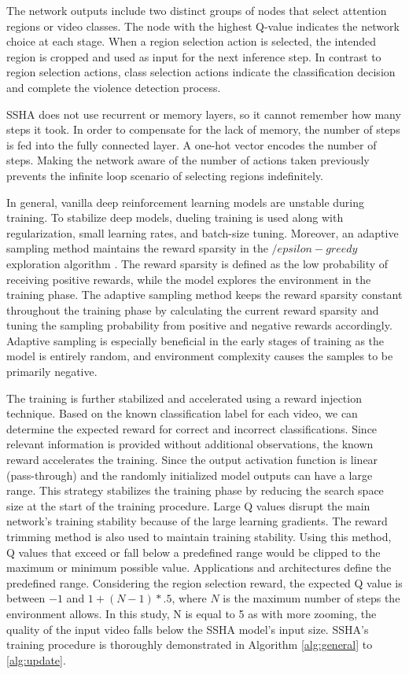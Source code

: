 \documentclass[review]{elsarticle}
\begin{document}
The network outputs include two distinct groups of nodes that select attention regions or video classes. The node with the highest Q-value indicates the network choice at each stage. When a region selection action is selected, the intended region is cropped and used as input for the next inference step. In contrast to region selection actions, class selection actions indicate the classification decision and complete the violence detection process.

SSHA does not use recurrent or memory layers, so it cannot remember how many steps it took. In order to compensate for the lack of memory, the number of steps is fed into the fully connected layer. A one-hot vector encodes the number of steps. Making the network aware of the number of actions taken previously prevents the infinite loop scenario of selecting regions indefinitely.

In general, vanilla deep reinforcement learning models are unstable during training. To stabilize deep models, dueling training {\citep{wang2016dueling}} is used along with regularization, small learning rates, and batch-size tuning. Moreover, an adaptive sampling method maintains the reward sparsity in the $/epsilon - greedy$ exploration algorithm \citep{sutton2018reinforcement}. The reward sparsity is defined as the low probability of receiving positive rewards, while the model explores the environment in the training phase. The adaptive sampling method keeps the reward sparsity constant throughout the training phase by calculating the current reward sparsity and tuning the sampling probability from positive and negative rewards accordingly. Adaptive sampling is especially beneficial in the early stages of training as the model is entirely random, and environment complexity causes the samples to be primarily negative.

The training is further stabilized and accelerated using a reward injection technique. Based on the known classification label for each video, we can determine the expected reward for correct and incorrect classifications. Since relevant information is provided without additional observations, the known reward accelerates the training. Since the output activation function is linear (pass-through) and the randomly initialized model outputs can have a large range. This strategy stabilizes the training phase by reducing the search space size at the start of the training procedure. Large Q values disrupt the main network's training stability because of the large learning gradients. The reward trimming method is also used to maintain training stability. Using this method, Q values that exceed or fall below a predefined range would be clipped to the maximum or minimum possible value. Applications and architectures define the predefined range. Considering the region selection reward, the expected Q value is between $-1$ and $1 + (N - 1) * .5$, where $N$ is the maximum number of steps the environment allows. In this study, N is equal to 5 as with more zooming, the quality of the input video falls below the SSHA model's input size. SSHA’s training procedure is thoroughly demonstrated in Algorithm \ref{alg:general} to \ref{alg:update}.
\end{document}

